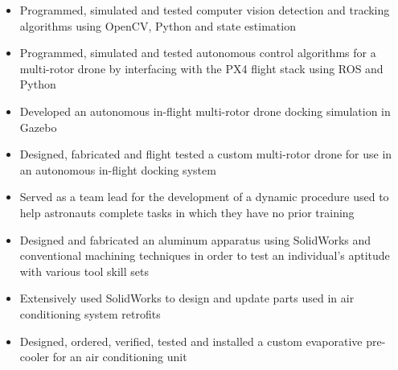 \documentclass[10pt,a4paper,ragged2e]{altacv}
\begin{document}

\begin{fullwidth}
  \makecvheader
\end{fullwidth}



\begin{itemize}
  \item Programmed, simulated and tested computer vision detection and tracking algorithms using OpenCV, Python and state estimation
  \item Programmed, simulated and tested autonomous control algorithms for a multi-rotor drone by interfacing with the PX4 flight stack using ROS and Python 
  \item Developed an autonomous in-flight multi-rotor drone docking simulation in Gazebo
  \item Designed, fabricated and flight tested a custom multi-rotor drone for use in an autonomous in-flight docking system 
\end{itemize}

\begin{itemize}
  \item Served as a team lead for the development of a dynamic procedure used to help astronauts complete tasks in which they have no prior training 
  \item Designed and fabricated an aluminum apparatus using SolidWorks and conventional machining techniques in order to test an individual’s aptitude with various tool skill sets
\end{itemize}

\divider

\begin{itemize}
  \item Extensively used SolidWorks to design and update parts used in air conditioning system retrofits
  \item Designed, ordered, verified, tested and installed a custom evaporative pre-cooler for an air conditioning unit
\end{itemize}
\end{document}
